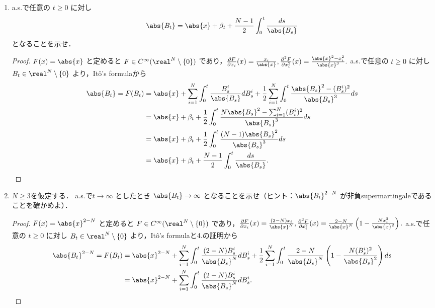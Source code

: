 \documentclass{jsarticle}
\begin{document}
\begin{enumerate}
    \item
    a.s.で任意の $t\ge0$ に対し
    $$
    \abs{B_t}
    = \abs{x}+\beta_t+\frac{N-1}{2}\int_0^t \frac{ds}{\abs{B_s}}
    $$
    となることを示せ．
    \begin{proof}
        $F(x)=\abs{x}$ と定めると $F\in C^\infty(\real^N\setminus\{0\})$ であり，$\frac{\partial F}{\partial x_i}(x)=\frac{x_i}{\abs{x}}, \frac{\partial^2 F}{\partial x_i^2}(x)=\frac{\abs{x}^2-x_i^2}{\abs{x}^3}.$
        a.s.で任意の $t\ge0$ に対し $B_t\in\real^N\setminus\{0\}$ より，It\^{o}'s formulaから
        \begin{align}
            \abs{B_t}
            = F(B_t)
            &= \abs{x}
            + \sum_{i=1}^{N}\int_0^t \frac{B_s^i}{\abs{B_s}}dB_s^i
            + \frac{1}{2}\sum_{i=1}^{N}\int_0^t \frac{\abs{B_s}^2-(B_s^i)^2}{\abs{B_s}^3}ds \\
            &= \abs{x}
            + \beta_t
            + \frac{1}{2}\int_0^t \frac{N\abs{B_s}^2-\sum_{i=1}^{N}(B_s^i)^2}{\abs{B_s}^3}ds \\
            &= \abs{x}
            + \beta_t
            + \frac{1}{2}\int_0^t \frac{(N-1)\abs{B_s}^2}{\abs{B_s}^3}ds \\
            &= \abs{x}
            + \beta_t
            + \frac{N-1}{2}\int_0^t \frac{ds}{\abs{B_s}}.
        \end{align}
    \end{proof}
    
    \item
    $N\ge3$を仮定する．
    a.s.で$t\to\infty$ としたとき $\abs{B_t}\to\infty$ となることを示せ（ヒント：$\abs{B_t}^{2-N}$ が非負supermartingaleであることを確かめよ）．
    \begin{proof}
        $F(x)=\abs{x}^{2-N}$ と定めると $F\in C^\infty(\real^N\setminus\{0\})$ であり，$\frac{\partial F}{\partial x_i}(x)=\frac{(2-N)x_i}{\abs{x}^N}, \frac{\partial^2 F}{\partial x_i^2}(x)=\frac{2-N}{\abs{x}^N}\left(1-\frac{Nx_i^2}{\abs{x}^2}\right).$
        a.s.で任意の $t\ge0$ に対し $B_t\in\real^N\setminus\{0\}$ より，It\^{o}'s formulaと4.の証明から
        \begin{align}
            \abs{B_t}^{2-N}
            = F(B_t)
            &= \abs{x}^{2-N}
            + \sum_{i=1}^{N}\int_0^t \frac{(2-N)B_s^i}{\abs{B_s}^N}dB_s^i
            + \frac{1}{2}\sum_{i=1}^{N}\int_0^t \frac{2-N}{\abs{B_s}^N}\left(1-\frac{N(B_s^i)^2}{\abs{B_s}^2}\right)ds \\
            &= \abs{x}^{2-N}
            + \sum_{i=1}^{N}\int_0^t \frac{(2-N)B_s^i}{\abs{B_s}^N}dB_s^i.
        \end{align}


\end{proof}
\end{enumerate}
\end{document}
